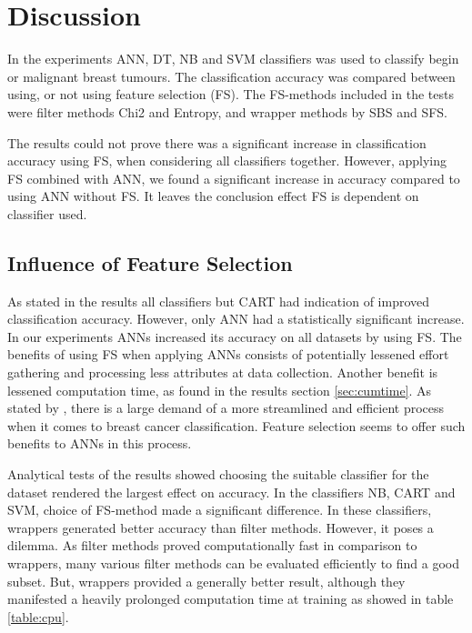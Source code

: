 \chapter{Discussion}

In the experiments ANN, DT, NB and SVM classifiers was used to classify begin or malignant breast tumours. The classification accuracy was compared between using, or not using feature selection (FS). The FS-methods included in the tests were filter methods Chi2 and Entropy, and wrapper methods by SBS and SFS.

The results could not prove there was a significant increase in classification accuracy using FS, when considering all classifiers together. However, applying FS combined with ANN, we found a significant increase in accuracy compared to using ANN without FS. It leaves the conclusion effect FS is dependent on classifier used.

\section{Influence of Feature Selection}

As stated in the results all classifiers but CART had indication of improved classification accuracy. However, only ANN had a statistically significant increase. In our experiments ANNs increased its accuracy on all datasets by using FS. The benefits of using FS when applying ANNs consists of potentially lessened effort gathering and processing less attributes at data collection. Another benefit is lessened computation time, as found in the results section \ref{sec:cumtime}. As stated by \textcite{martei2018}, there is a large demand of a more streamlined and efficient process when it comes to breast cancer classification. Feature selection seems to offer such benefits to ANNs in this process.

Analytical tests of the results showed choosing the suitable classifier for the dataset rendered the largest effect on accuracy. In the classifiers NB, CART and SVM, choice of FS-method made a significant difference. In these classifiers, wrappers generated better accuracy than filter methods. However, it poses a dilemma. As filter methods proved computationally fast in comparison to wrappers, many various filter methods can be evaluated efficiently to find a good subset. But, wrappers provided a generally better result, although they manifested a heavily prolonged computation time at training as showed in table \ref{table:cpu}.

